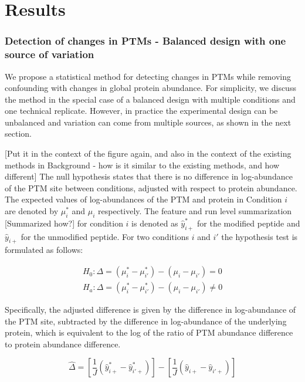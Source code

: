 \documentclass[mcp]{article}
\numberwithin{table}{section}
\def\todo#1{{\color{red}[#1]}}
\begin{document}
\section*{Results}

\subsubsection*{Detection of changes in PTMs - Balanced design with one source of variation}
\label{sec:adjustment_summary}

We propose a statistical method for detecting changes in PTMs while removing confounding with changes in global protein abundance. For simplicity, we discuss the method in the special case of a balanced design with multiple conditions and one technical replicate. However, in  practice the experimental design can be unbalanced and variation can come from multiple sources, as shown in the next section.

\todo{Put it in the context of the figure again, and also in the context of the existing methods in Background - how is it similar to the existing methods, and how different} The null hypothesis states that there is no difference in log-abundance of the PTM site between conditions, adjusted with respect to protein abundance. The expected values of log-abundances of the PTM and protein in Condition $i$ are denoted by $\mu_{i}^{\ast}$ and $\mu_{i}$ respectively. The feature and run level summarization \todo{Summarized how?} for condition $i$ is denoted as $\hat{y}_{i+}^{\ast}$ for the modified peptide and $\hat{y}_{i+}$ for the unmodified peptide. For two conditions $i$ and $i'$ the hypothesis test is formulated as follows:

\begin{equation}
\begin{aligned}
H_{0}: \Delta = ( \mu_{i}^{\ast} - \mu_{i'}^{\ast} ) - ( \mu_{i} - \mu_{i'} ) = 0 \\
H_{a}: \Delta = ( \mu_{i}^{\ast} - \mu_{i'}^{\ast} ) - ( \mu_{i} - \mu_{i'} ) \neq 0
\end{aligned}
\label{eq_1}
\end{equation}

Specifically, the adjusted difference is given by the difference in log-abundance of the PTM site, subtracted by the difference in log-abundance of the underlying protein, which is equivalent to the log of the ratio of PTM abundance difference to protein abundance difference. 

\begin{equation}
\hat{\Delta} = \left[ \frac{1}{J} \left( \hat{y}_{i+}^{\ast} - \hat{y}_{i'+}^{\ast} \right) \right] - \left[ \frac{1}{J} \left( \hat{y}_{i+} - \hat{y}_{i'+} \right) \right]
\end{equation}
\end{document}
